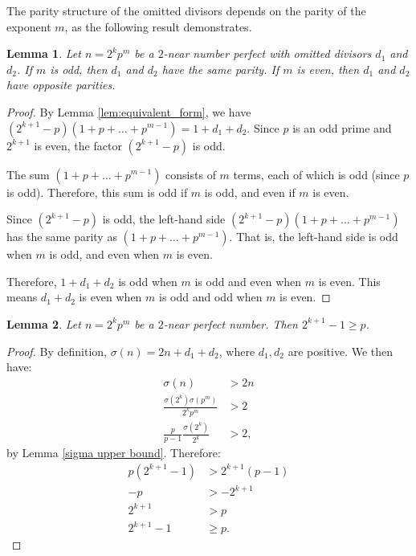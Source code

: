 \documentclass[10pt]{article}
\newtheorem{lemma}{Lemma}
\theoremstyle{definition}
\begin{document}
The parity structure of the omitted divisors depends on the parity of the exponent $m$, as the following result demonstrates.

\begin{lemma}\label{lem:parity_constraint}
    Let $n=2^kp^m$ be a $2$-near number perfect with omitted divisors $d_1$ and $d_2$. If $m$ is odd, then $d_1$ and $d_2$ have the same parity. If $m$ is even, then $d_1$ and $d_2$ have opposite parities.
\end{lemma}
\begin{proof}
    By Lemma \ref{lem:equivalent_form}, we have $(2^{k+1}-p)(1+p+\ldots+p^{m-1})=1+d_1+d_2$. Since $p$ is an odd prime and $2^{k+1}$ is even, the factor $(2^{k+1}-p)$ is odd.

    The sum $(1+p+\ldots+p^{m-1})$ consists of $m$ terms, each of which is odd (since $p$ is odd). Therefore, this sum is odd if $m$ is odd, and even if $m$ is even.

    Since $(2^{k+1}-p)$ is odd, the left-hand side $(2^{k+1}-p)(1+p+\ldots+p^{m-1})$ has the same parity as $(1+p+\ldots+p^{m-1})$. That is, the left-hand side is odd when $m$ is odd, and even when $m$ is even.

    Therefore, $1+d_1+d_2$ is odd when $m$ is odd and even when $m$ is even. This means $d_1+d_2$ is even when $m$ is odd and odd when $m$ is even.
\end{proof}

\begin{lemma}\label{lem:2k_geq_p}
    Let $n=2^kp^m$ be a $2$-near perfect number. Then $2^{k+1}-1\ge p$.
\end{lemma}
\begin{proof}
    By definition, $\sigma(n)=2n+d_1+d_2$, where $d_1,d_2$ are positive. We then have: 
    \begin{align*}
       \sigma(n)&>2n \\
       \frac{\sigma(2^k)\sigma(p^m)}{2^kp^m}&>2\\
       \frac{p}{p-1}\frac{\sigma(2^k)}{2^k}&>2,
    \end{align*} by Lemma \ref{sigma upper bound}. Therefore:
    \begin{align*}
       p(2^{k+1}-1)&>2^{k+1}(p-1) \\
       -p&>-2^{k+1}\\
       2^{k+1}&>p\\
    2^{k+1}-1&\ge p.
    \end{align*}
\end{proof}
\end{document}
